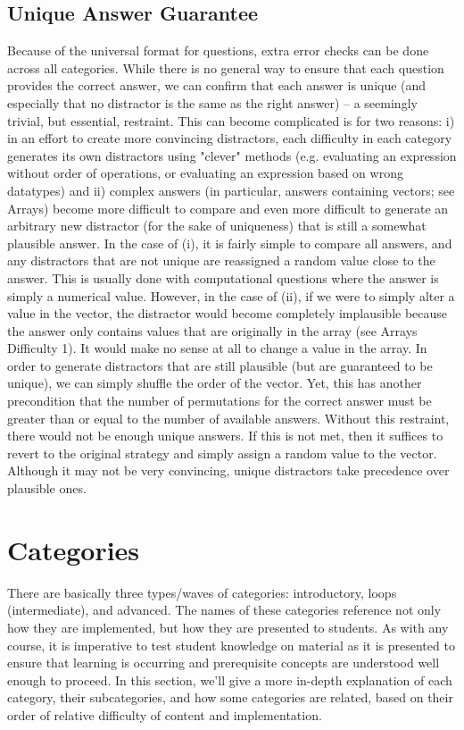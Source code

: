 \documentclass{article}
\begin{document}
\subsection{Unique Answer Guarantee}

Because of the universal format for questions, extra error checks can be done across all categories. While there is no general way
to ensure that each question provides the correct answer, we can confirm that each answer is unique
(and especially that no distractor is the same as the right answer) -- a seemingly trivial, but essential, restraint.
This can become complicated is for two reasons: i) in an effort to create more convincing distractors,
each difficulty in each category generates its own distractors using "clever" methods (e.g. evaluating an expression
without order of operations, or evaluating an expression based on wrong datatypes) and ii) complex answers
(in particular, answers containing vectors; see Arrays) become more difficult to compare and even more difficult
to generate an arbitrary new distractor (for the sake of uniqueness) that is still a somewhat plausible answer.
In the case of (i), it is fairly simple to compare all answers, and any distractors that are not unique are reassigned
a random value close to the answer. This is usually done with computational questions where the answer is simply a
numerical value. However, in the case of (ii), if we were to simply alter a value in the vector, the distractor would
become completely implausible because the answer only contains values that are originally in the array (see Arrays
Difficulty 1). It would make no sense at all to change a value in the array. In order to generate distractors that
are still plausible (but are guaranteed to be unique), we can simply shuffle the order of the vector. Yet, this has
another precondition that the number of permutations for the correct answer must be greater than or equal to the
number of available answers. Without this restraint, there would not be enough unique answers. If this is not met,
then it suffices to revert to the original strategy and simply assign a random value to the vector. Although it may
not be very convincing, unique distractors take precedence over plausible ones.


\section{Categories}

There are basically three types/waves of categories: introductory, loops (intermediate), and advanced. The names of these categories reference not only how
they are implemented, but how they are presented to students. As with any course, it is imperative to test student knowledge on material as it is presented
to ensure that learning is occurring and prerequisite concepts are understood well enough to proceed. In this section, we'll give a more in-depth explanation
of each category, their subcategories, and how some categories are related, based on their order of relative difficulty of content and implementation.
\end{document}
